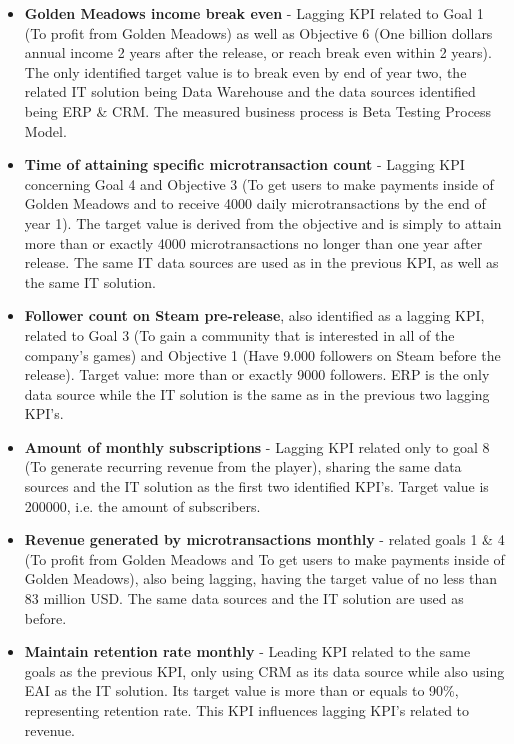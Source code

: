 \documentclass{article}
\begin{document}
\begin{itemize}

\item \textbf{Golden Meadows income break even} - Lagging KPI related to Goal 1 (To profit from Golden Meadows) as well as Objective 6 (One billion dollars annual income 2 years after the release, or reach break even within 2 years). The only identified target value is to break even by end of year two, the related IT solution being Data Warehouse and the data sources identified being ERP \& CRM. The measured business process is Beta Testing Process Model.

\item \textbf{Time of attaining specific microtransaction count} - Lagging KPI concerning Goal 4 and Objective 3 (To get users to make payments inside of Golden Meadows and to receive 4000 daily microtransactions by the end of year 1). The target value is derived from the objective and is simply to attain more than or exactly 4000 microtransactions no longer than one year after release. The same IT data sources are used as in the previous KPI, as well as the same IT solution.

\item \textbf{Follower count on Steam pre-release}, also identified as a lagging KPI, related to Goal 3 (To gain a community that is interested in all of the company's games) and Objective 1 (Have 9.000 followers on Steam before the release). Target value: more than or exactly 9000 followers. ERP is the only data source while the IT solution is the same as in the previous two lagging KPI's.

\item \textbf{Amount of monthly subscriptions} - Lagging KPI related only to goal 8 (To generate recurring revenue from the player), sharing the same data sources and the IT solution as the first two identified KPI's. Target value is 200000, i.e. the amount of subscribers.

\item \textbf{Revenue generated by microtransactions monthly} - related goals 1 \& 4 (To profit from Golden Meadows and To get users to make payments inside of Golden Meadows), also being lagging, having the target value of no less than 83 million USD. The same data sources and the IT solution are used as before.

\item \textbf{Maintain retention rate monthly} - Leading KPI related to the same goals as the previous KPI, only using CRM as its data source while also using EAI as the IT solution. Its target value is more than or equals to 90\%, representing retention rate. This KPI influences lagging KPI's related to revenue. 


\end{itemize}
\end{document}
